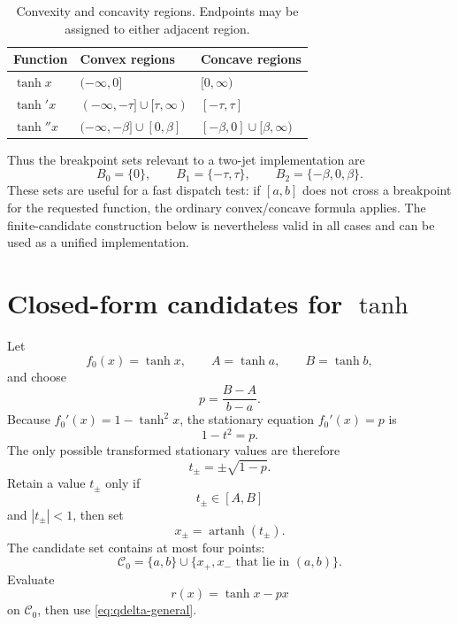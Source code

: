 \documentclass[11pt]{article}
\newcommand{\artanh}{\operatorname{artanh}}
\newcommand{\cand}{\mathcal{C}}
\begin{document}
\begin{table}[ht]
\centering
\caption{Convexity and concavity regions. Endpoints may be assigned to either adjacent region.}
\label{tab:curvature}
\renewcommand{\arraystretch}{1.25}
\begin{tabular}{>{\raggedright\arraybackslash}p{} p{} p{}}
\toprule
Function & Convex regions & Concave regions \\
\midrule
\(\tanh x\) & \(( -\infty,0]\) & \([0,\infty)\) \\
\(\tanh' x\) & \(( -\infty,-\tau]\cup[\tau,\infty)\) & \([ -\tau,\tau]\) \\
\(\tanh''x\) & \(( -\infty,-\beta]\cup[0,\beta]\) & \([ -\beta,0]\cup[\beta,\infty)\) \\
\bottomrule
\end{tabular}
\end{table}

Thus the breakpoint sets relevant to a two-jet implementation are
\[
  B_0=\{0\},\qquad
  B_1=\{-\tau,\tau\},\qquad
  B_2=\{-\beta,0,\beta\}.
\]
These sets are useful for a fast dispatch test: if \([a,b]\) does not cross a breakpoint for the requested function, the ordinary convex/concave formula applies. The finite-candidate construction below is nevertheless valid in all cases and can be used as a unified implementation.

\section{Closed-form candidates for \(\tanh\)}

Let
\[
  f_0(x)=\tanh x,
  \qquad A=\tanh a,
  \qquad B=\tanh b,
\]
and choose
\begin{equation}\label{eq:p0}
  p=\frac{B-A}{b-a}.
\end{equation}
Because \(f_0'(x)=1-\tanh^2x\), the stationary equation \(f_0'(x)=p\) is
\[
  1-t^2=p.
\]
The only possible transformed stationary values are therefore
\begin{equation}\label{eq:t0candidates}
  t_\pm=\pm\sqrt{1-p}.
\end{equation}
Retain a value \(t_\pm\) only if
\[
  t_\pm\in[A,B]
\]
and \(|t_\pm|<1\), then set
\[
  x_\pm=\artanh(t_\pm).
\]
The candidate set contains at most four points:
\begin{equation}\label{eq:C0}
  \cand_0=\{a,b\}\cup\{x_+,x_-\text{ that lie in }(a,b)\}.
\end{equation}
Evaluate
\[
  r(x)=\tanh x-px
\]
on \(\cand_0\), then use \eqref{eq:qdelta-general}.
\end{document}

